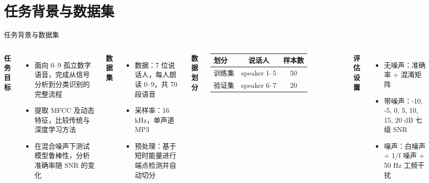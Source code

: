 
\section{任务背景与数据集}

\begin{frame}{任务背景与数据集}
  \small
  \begin{columns}[T]
    \textbf{任务目标}
    \begin{itemize}
      \setlength{\itemsep}{1pt}
      \item 面向 0–9 孤立数字语音，完成从信号分析到分类识别的完整流程
      \item 提取 MFCC 及动态特征，比较传统与深度学习方法
      \item 在混合噪声下测试模型鲁棒性，分析准确率随 SNR 的变化
    \end{itemize}

    \vspace{1pt}
    \textbf{数据集}
    \begin{itemize}
      \setlength{\itemsep}{1pt}
      \item 数据：7 位说话人，每人朗读 0–9，共 70 段语音
      \item 采样率：16 kHz，单声道 MP3
      \item 预处理：基于短时能量进行端点检测并自动切分
    \end{itemize}

    \textbf{数据划分}
    \vspace{-2pt}
    \begin{table}
      \centering
      \footnotesize
      \begin{tabular}{lcc}
        \toprule
        划分 & 说话人 & 样本数 \\
        \midrule
        训练集 & speaker 1--5 & 50 \\
        验证集 & speaker 6--7 & 20 \\
        \bottomrule
      \end{tabular}
    \end{table}

    \vspace{-5pt}
    \textbf{评估设置}
    \begin{itemize}
      \setlength{\itemsep}{1pt}
      \item 无噪声：准确率 + 混淆矩阵
      \item 带噪声：-10, -5, 0, 5, 10, 15, 20 dB 七级 SNR
      \item 噪声：白噪声 + 1/f 噪声 + 50 Hz 工频干扰
    \end{itemize}
  \end{columns}
\end{frame}